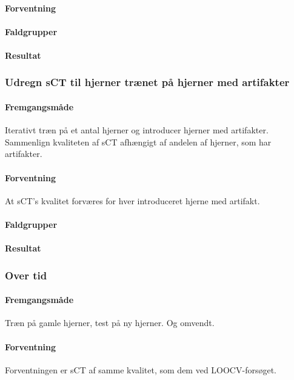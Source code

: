 \paragraph{Forventning}

\paragraph{Faldgrupper}

\paragraph{Resultat}

\subsubsection{Udregn sCT til hjerner trænet på hjerner med artifakter}
\paragraph{Fremgangsmåde}
Iterativt træn på et antal hjerner og introducer hjerner med artifakter.
Sammenlign kvaliteten af sCT afhængigt af andelen af hjerner, som har
artifakter.

\paragraph{Forventning}
At sCT's kvalitet forværes for hver introduceret hjerne med artifakt.

\paragraph{Faldgrupper}

\paragraph{Resultat}


\subsubsection{Over tid}
\paragraph{Fremgangsmåde}
Træn på gamle hjerner, test på ny hjerner. Og omvendt.

\paragraph{Forventning}
Forventningen er sCT af samme kvalitet, som dem ved LOOCV-forsøget.

